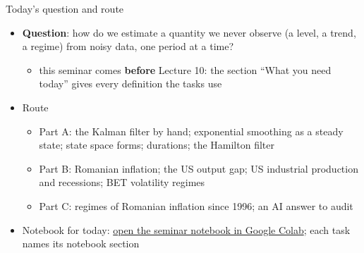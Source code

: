 
\begin{frame}{Today's question and route}
\itemsize{\small}
\begin{itemize}
    \item \textbf{Question}: how do we estimate a quantity we never observe (a level, a trend, a regime) from noisy data, one period at a time?
    \begin{itemize}
        \item this seminar comes \textbf{before} Lecture 10: the section ``What you need today'' gives every definition the tasks use
    \end{itemize}
    \item Route
    \begin{itemize}
        \item Part A: the Kalman filter by hand; exponential smoothing as a steady state; state space forms; durations; the Hamilton filter
        \item Part B: Romanian inflation; the US output gap; US industrial production and recessions; BET volatility regimes
        \item Part C: regimes of Romanian inflation since 1996; an AI answer to audit
    \end{itemize}
    \item Notebook for today: \href{\nb}{open the seminar notebook in Google Colab}; each task names its notebook section
\end{itemize}
\end{frame}

